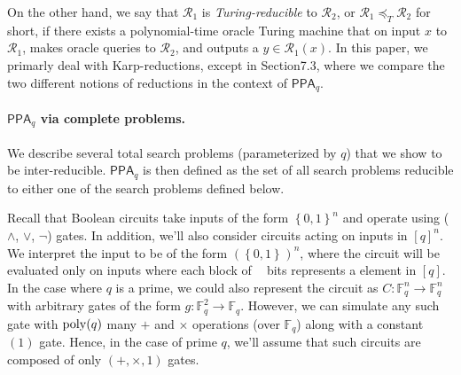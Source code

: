\documentclass[10pt,a4paper]{article}
\theoremstyle{definition}
\theoremstyle{remark}
\def\ceil#1{\mathop{\left\lceil#1\right\rceil}}
\def\set#1{\left\{#1\right\}}
\newcommand{\bbF}{\ensuremath{\mathbb{F}}}
\newcommand{\calR}{\mathcal{R}}
\newcommand{\bit}{\ensuremath{\set{0,1}}}
\DeclareMathOperator*{\poly}{\ensuremath\mathrm{poly}}
\newcommand{\class}[1]{\ensuremath{\mathsf{#1}}\xspace}
\newcommand{\PPA}{\class{PPA}}
\begin{document}
On the other hand, we say that $\calR_1$ is {\em Turing-reducible} to $\calR_2$, or $\calR_1 \preceq_T \calR_2$ for short, if there exists a polynomial-time oracle Turing machine that on input $x$ to $\calR_1$, makes oracle queries to $\calR_2$, and outputs a $y \in \calR_1(x)$. In this paper, we primarly deal with Karp-reductions, except in Section7.3, where we compare the two different notions of reductions in the context of $\PPA_q$.

\paragraph{\boldmath $\PPA_q$ via complete problems.} We describe several total search problems (parameterized by $q$) that we show to be inter-reducible. $\PPA_q$ is then defined as the set of all search problems reducible to either one of the search problems defined below.

Recall that Boolean circuits take inputs of the form $\bit^n$ and operate using ($\wedge$, $\vee$, $\lnot$) gates. In addition, we'll also consider circuits acting on inputs in $[q]^n$. We interpret the input to be of the form $(\bit^{\ceil{\log q}})^n$, where the circuit will be evaluated only on inputs where each block of $\ceil{\log q}$ bits represents a element in $[q]$. In the case where $q$ is a prime, we could also represent the circuit as $C:\bbF_q^n \to \bbF_q^n$ with arbitrary gates of the form $g: \bbF_q^2 \to \bbF_q$. However, we can simulate any such gate with $\poly(q)$ many $+$ and $\times$ operations (over $\bbF_q$) along with a constant $(1)$ gate. Hence, in the case of prime $q$, we'll assume that such circuits are composed of only $(+, \times, 1)$ gates.\\[1mm]
\end{document}
